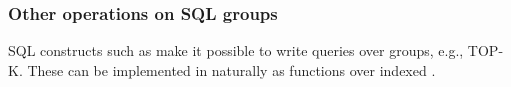 %
%
%
%
%
%
%

\subsubsection{Other operations on SQL groups}

SQL constructs such as  make it possible to
write queries over groups, e.g., TOP-K.  These can be implemented in
\dbsp naturally as functions over indexed \zrs.

